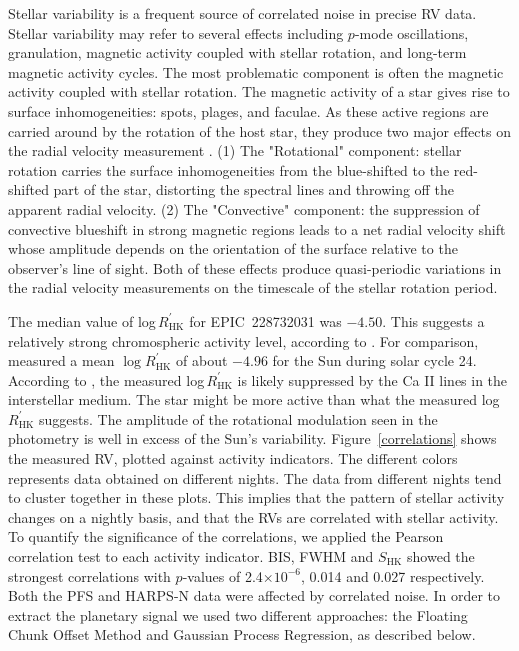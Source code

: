 \documentclass[twocolumn]{aastex61}
\begin{document}
Stellar variability is a frequent source of correlated noise in precise RV data. Stellar variability may refer to several effects including $p$-mode oscillations, granulation, magnetic activity coupled with stellar rotation, and long-term magnetic activity cycles. The most problematic component is often the magnetic activity coupled with stellar rotation. The magnetic activity of a star gives rise to surface inhomogeneities: spots, plages, and faculae. As these active regions are carried around by the rotation of the host star, they produce two major effects on the radial velocity measurement \citep[see, e.g.,][]{Lindegren2003,Haywood2016}. (1) The "Rotational" component: stellar rotation carries the surface inhomogeneities from the blue-shifted to the red-shifted part of the star, distorting the spectral lines and throwing off the
apparent radial velocity. (2) The "Convective" component: the suppression of convective blueshift in strong magnetic regions leads to a net radial velocity shift whose amplitude depends on the orientation of the surface relative to the observer's line of sight. Both of these effects produce quasi-periodic variations in the radial velocity measurements on the timescale of the stellar rotation period.

The median value of log\,$R^\prime_\mathrm{HK}$ for EPIC~228732031 was $-4.50$. This suggests a relatively strong chromospheric activity level, according to \citet{Isaacson2010}. For comparison, \citet{Egeland2017} measured a mean $\log R^\prime_\mathrm{HK}$ of about $-4.96$ for the Sun during solar cycle 24. According to \citet{Fossati2017}, the measured log\,$R^\prime_\mathrm{HK}$ is likely suppressed by the Ca II lines in the interstellar medium. 
The star might be more active than what the measured log\,$R^\prime_\mathrm{HK}$ suggests.
The amplitude of the rotational modulation seen in the photometry is well in excess of the Sun's variability.
Figure~\ref{correlations} shows the measured RV, plotted against activity
indicators. The different colors represents data obtained on different
nights. The data from different nights tend to cluster
together in these plots. This implies that the pattern of stellar activity changes on a nightly basis, and that the RVs are correlated with stellar activity. To quantify the significance of the correlations, we applied the Pearson correlation test to each activity indicator. BIS, FWHM and $S_{\text{HK}}$ showed the strongest correlations with $p$-values of 2.4$\times 10^{-6}$, 0.014 and 0.027 respectively. Both the PFS and HARPS-N data were affected by correlated noise. In order to extract the planetary signal we used two different approaches: the Floating Chunk Offset Method and Gaussian Process Regression, as described below.
\end{document}
